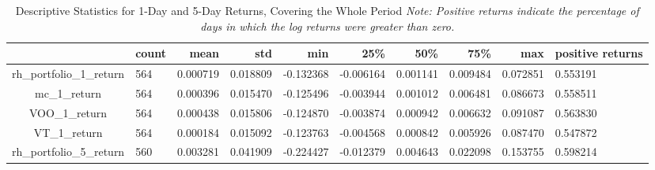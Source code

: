 \begin{appendices}
\begin{table}[ht]
\centering
\caption{Descriptive Statistics for 1-Day and 5-Day Returns, Covering the Whole Period \newline \footnotesize{\textit{Note: Positive returns indicate the percentage of days in which the log returns were greater than zero.}}}
\begin{adjustbox}{width=\textwidth}
\begin{tabular}{@{}clllllllll@{}}
    \toprule
    \multicolumn{1}{r}{}     & \multicolumn{1}{r}{\textbf{count}} & \multicolumn{1}{r}{\textbf{mean}} & \multicolumn{1}{r}{\textbf{std}} & \multicolumn{1}{r}{\textbf{min}} & \multicolumn{1}{r}{\textbf{25\%}} & \multicolumn{1}{r}{\textbf{50\%}} & \multicolumn{1}{r}{\textbf{75\%}} & \multicolumn{1}{r}{\textbf{max}} & \multicolumn{1}{r}{\textbf{positive returns}} \\ \midrule
    rh\_portfolio\_1\_return & 564                                & 0.000719                          & 0.018809                         & -0.132368                        & -0.006164                         & 0.001141                          & 0.009484                          & 0.072851                         & 0.553191                                      \\
    mc\_1\_return            & 564                                & 0.000396                          & 0.015470                         & -0.125496                        & -0.003944                         & 0.001012                          & 0.006481                          & 0.086673                         & 0.558511                                      \\
    VOO\_1\_return           & 564                                & 0.000438                          & 0.015806                         & -0.124870                        & -0.003874                         & 0.000942                          & 0.006632                          & 0.091087                         & 0.563830                                      \\
    VT\_1\_return            & 564                                & 0.000184                          & 0.015092                         & -0.123763                        & -0.004568                         & 0.000842                          & 0.005926                          & 0.087470                         & 0.547872                                      \\
    rh\_portfolio\_5\_return & 560                                & 0.003281                          & 0.041909                         & -0.224427                        & -0.012379                         & 0.004643                          & 0.022098                          & 0.153755                         & 0.598214                                      \\

\end{tabular}
\end{adjustbox}
\end{table}
\end{appendices}
